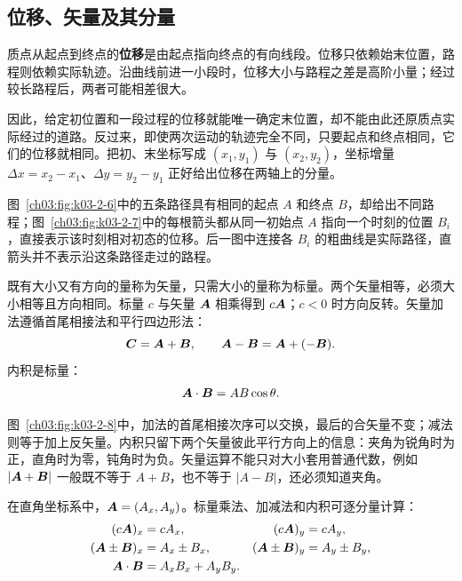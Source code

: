 {\subsection{位移、矢量及其分量}

质点从起点到终点的\textbf{位移}是由起点指向终点的有向线段。位移只依赖始末位置，路程则依赖实际轨迹。沿曲线前进一小段时，位移大小与路程之差是高阶小量；经过较长路程后，两者可能相差很大。

因此，给定初位置和一段过程的位移就能唯一确定末位置，却不能由此还原质点实际经过的道路。反过来，即使两次运动的轨迹完全不同，只要起点和终点相同，它们的位移就相同。把初、末坐标写成 $(x_1,y_1)$ 与 $(x_2,y_2)$，坐标增量 $\Delta x=x_2-x_1$、$\Delta y=y_2-y_1$ 正好给出位移在两轴上的分量。

\PathChoicesDiagram

图~\ref{ch03:fig:k03-2-6}中的五条路径具有相同的起点 $A$ 和终点 $B$，却给出不同路程；图~\ref{ch03:fig:k03-2-7}中的每根箭头都从同一初始点 $A$ 指向一个时刻的位置 $B_i$，直接表示该时刻相对初态的位移。后一图中连接各 $B_i$ 的粗曲线是实际路径，直箭头并不表示沿这条路径走过的路程。

\DisplacementFanDiagram

既有大小又有方向的量称为矢量，只需大小的量称为标量。两个矢量相等，必须大小相等且方向相同。标量 $c$ 与矢量 $\bm{A}$ 相乘得到 $c\bm{A}$；$c<0$ 时方向反转。矢量加法遵循首尾相接法和平行四边形法：
\begin{equation}
\bm{C}=\bm{A}+\bm{B},
\qquad
\bm{A}-\bm{B}=\bm{A}+(-\bm{B}).
\end{equation}
内积是标量：
\begin{equation}
  \bm{A}\cdot\bm{B}=AB\cos\theta.
\end{equation}

\VectorOperationsDiagram

图~\ref{ch03:fig:k03-2-8}中，加法的首尾相接次序可以交换，最后的合矢量不变；减法则等于加上反矢量。内积只留下两个矢量彼此平行方向上的信息：夹角为锐角时为正，直角时为零，钝角时为负。矢量运算不能只对大小套用普通代数，例如 $|\bm{A}+\bm{B}|$ 一般既不等于 $A+B$，也不等于 $|A-B|$，还必须知道夹角。

在直角坐标系中，$\bm{A}=(A_x,A_y)$。标量乘法、加减法和内积可逐分量计算：
\begin{align}
(c\bm{A})_x&=cA_x,&(c\bm{A})_y&=cA_y,\\
(\bm{A}\pm\bm{B})_x&=A_x\pm B_x,&
(\bm{A}\pm\bm{B})_y&=A_y\pm B_y,\\
\bm{A}\cdot\bm{B}&=A_xB_x+A_yB_y.
\end{align}

}
